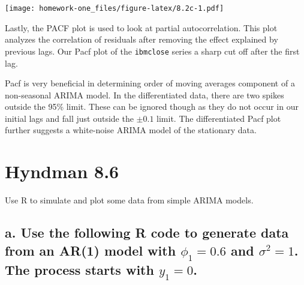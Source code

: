 \documentclass[openany]{book}
\begin{document}
\texttt{[image: homework-one\_files/figure-latex/8.2c-1.pdf]}

Lastly, the PACF plot is used to look at partial autocorrelation. This plot analyzes the correlation of residuals after removing the effect explained by previous lags. Our Pacf plot of the \texttt{ibmclose} series a sharp cut off after the first lag.

Pacf is very beneficial in determining order of moving averages component of a non-seasonal ARIMA model. In the differentiated data, there are two spikes outside the 95\% limit. These can be ignored though as they do not occur in our initial lags and fall just outside the \(\pm 0.1\) limit. The differentiated Pacf plot further suggests a white-noise ARIMA model of the stationary data.

\hypertarget{hyndman-8.6}{%
\section{Hyndman 8.6}\label{hyndman-8.6}}

Use R to simulate and plot some data from simple ARIMA models.

\hypertarget{a.-use-the-following-r-code-to-generate-data-from-an-ar1-model-with-phi_10.6-and-sigma21.-the-process-starts-with-y_10.}{%
\subsection{\texorpdfstring{a. Use the following R code to generate data from an AR(1) model with \(\phi_1=0.6\) and \(\sigma^2=1\). The process starts with \(y_1=0\).}{a. Use the following R code to generate data from an AR(1) model with \textbackslash{}phi\_1=0.6 and \textbackslash{}sigma\^{}2=1. The process starts with y\_1=0.}}\label{a.-use-the-following-r-code-to-generate-data-from-an-ar1-model-with-phi_10.6-and-sigma21.-the-process-starts-with-y_10.}}
\end{document}
